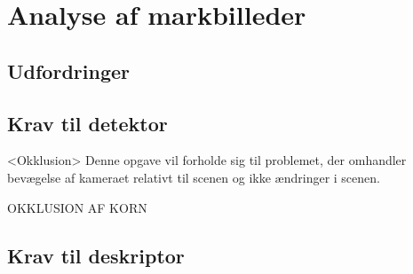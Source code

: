 \chapter{Analyse af markbilleder} \label{sec:mark}
\section{Udfordringer}
\section{Krav til detektor}
<Okklusion>
Denne opgave vil forholde sig til problemet, der omhandler bevægelse af kameraet relativt til scenen og ikke ændringer i scenen.

OKKLUSION AF KORN
\section{Krav til deskriptor}